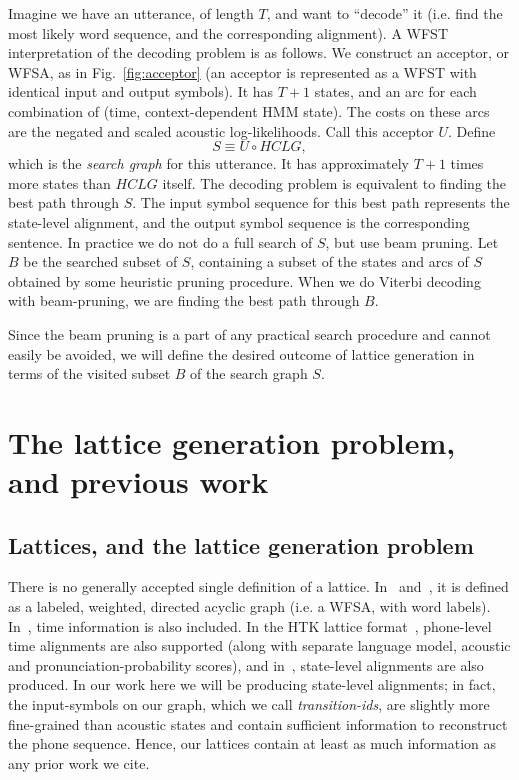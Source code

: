 \documentclass{article}
\def\HCLG{{\mathit{HCLG}}}
\begin{document}
Imagine we have an utterance, of length $T$, and want to ``decode'' it (i.e. find
the most likely word sequence, and the corresponding alignment).  A WFST
interpretation of the decoding problem is as follows.  We construct an
acceptor, or WFSA, as in Fig.~\ref{fig:acceptor} (an acceptor is represented as a
WFST with identical input and output symbols).  It has $T{+}1$ states,
and an arc for each combination of (time, context-dependent HMM state).  The
costs on these arcs are the negated and scaled acoustic log-likelihoods.
Call this acceptor $U$.  Define
\begin{equation}
   S \equiv U \circ \HCLG,
\end{equation}
which is the {\em search graph} for this utterance.  It has approximately $T+1$ times
more states than $\HCLG$ itself.  The decoding problem is equivalent to finding
the best path through $S$.  The input symbol sequence for this best path represents
the state-level alignment, and the output symbol sequence is the corresponding
sentence.  In practice we do not do a full search of $S$, but use beam pruning.
Let $B$ be the searched subset of $S$, containing a subset of the states and arcs
of $S$ obtained by some heuristic pruning procedure.  
When we do Viterbi decoding with beam-pruning, we are finding the best path through $B$. 

Since the beam pruning is a part of any practical search procedure and cannot
easily be avoided, we will define the desired outcome of lattice generation in terms
of the visited subset $B$ of the search graph $S$.

\section{The lattice generation problem, and previous work}
\label{sec:lattices}

\subsection{Lattices, and the lattice generation problem}

There is no generally accepted single definition of a lattice.  In~\cite{efficient_general}
and~\cite{sak2010fly}, it is defined as a labeled, weighted, directed acyclic graph
(i.e. a WFSA, with word labels).  In~\cite{ney_word_graph}, time information
is also included.  In the HTK lattice format~\cite{htkbook}, phone-level time alignments 
are also supported (along with separate language model, acoustic and pronunciation-probability 
scores), and in~\cite{saon2005anatomy}, state-level alignments are also produced.
In our work here we will be producing state-level alignments; in fact, the input-symbols
on our graph, which we call {\em transition-ids}, are slightly more fine-grained
than acoustic states and contain sufficient information to reconstruct the phone
sequence.  Hence, our lattices contain at least as much information as any prior work
we cite.
\end{document}
